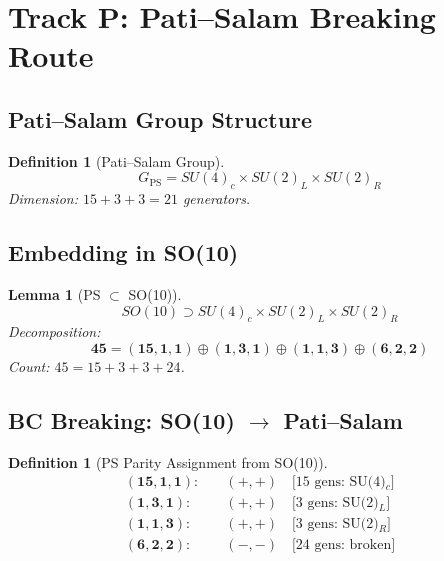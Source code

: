 \documentclass[11pt,a4paper]{article}
\newtheorem{lemma}[theorem]{Lemma}
\newtheorem{definition}[theorem]{Definition}
\begin{document}
\section{Track P: Pati--Salam Breaking Route}
\label{sec:track-p}

\subsection{Pati--Salam Group Structure}

\begin{definition}[Pati--Salam Group]
\begin{equation}
  G_{\text{PS}} = SU(4)_c \times SU(2)_L \times SU(2)_R
  \label{eq:ps-group}
\end{equation}
Dimension: $15 + 3 + 3 = 21$ generators.
\end{definition}

\subsection{Embedding in SO(10)}

\begin{lemma}[PS $\subset$ SO(10)]
\label{lem:ps-embedding}
\begin{equation}
  SO(10) \supset SU(4)_c \times SU(2)_L \times SU(2)_R
  \label{eq:ps-in-so10}
\end{equation}
Decomposition:
\begin{equation}
  \mathbf{45} = (\mathbf{15}, \mathbf{1}, \mathbf{1}) \oplus
    (\mathbf{1}, \mathbf{3}, \mathbf{1}) \oplus (\mathbf{1}, \mathbf{1}, \mathbf{3})
    \oplus (\mathbf{6}, \mathbf{2}, \mathbf{2})
  \label{eq:so10-ps-decomp}
\end{equation}
Count: $45 = 15 + 3 + 3 + 24$.
\end{lemma}

\subsection{BC Breaking: SO(10) $\to$ Pati--Salam}

\begin{definition}[PS Parity Assignment from SO(10)]
\label{def:ps-parity}
\begin{align}
  (\mathbf{15}, \mathbf{1}, \mathbf{1}): & \quad (+,+) \quad \text{[15 gens: SU(4)$_c$]}
  \label{eq:ps-p1} \\
  (\mathbf{1}, \mathbf{3}, \mathbf{1}): & \quad (+,+) \quad \text{[3 gens: SU(2)$_L$]}
  \label{eq:ps-p2} \\
  (\mathbf{1}, \mathbf{1}, \mathbf{3}): & \quad (+,+) \quad \text{[3 gens: SU(2)$_R$]}
  \label{eq:ps-p3} \\
  (\mathbf{6}, \mathbf{2}, \mathbf{2}): & \quad (-,-) \quad \text{[24 gens: broken]}
  \label{eq:ps-p4}
\end{align}
\end{definition}
\end{document}
